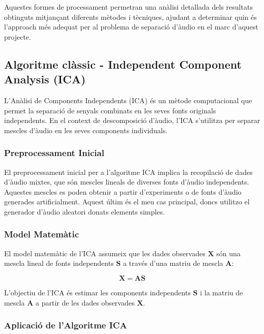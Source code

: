 \documentclass[10pt,a4paper,twocolumn,twoside]{article}
\begin{document}
Aquestes formes de processament permetran una anàlisi detallada dels resultats obtinguts mitjançant diferents mètodes i tècniques, ajudant a determinar quin és l'approach més adequat per al problema de separació d'àudio en el marc d'aquest projecte.

\subsection{Algoritme clàssic - Independent Component Analysis (ICA)}

L'Anàlisi de Components Independents (ICA) és un mètode computacional que permet la separació de senyals combinats en les seves fonts originals independents. En el context de descomposició d'àudio, l'ICA s'utilitza per separar mescles d'àudio en les seves components individuals.

\subsubsection{Preprocessament Inicial}

El preprocessament inicial per a l'algoritme ICA implica la recopilació de dades d'àudio mixtes, que són mescles lineals de diverses fonts d'àudio independents. Aquestes mescles es poden obtenir a partir d'experiments o de fonts d'àudio generades artificialment. Aquest últim és el meu cas principal, doncs utilitzo el generador d'àudio aleatori donats elements simples.

\subsubsection{Model Matemàtic}

El model matemàtic de l'ICA assumeix que les dades observades $\mathbf{X}$ són una mescla lineal de fonts independents $\mathbf{S}$ a través d'una matriu de mescla $\mathbf{A}$:

\begin{equation}
\mathbf{X} = \mathbf{A} \mathbf{S}
\end{equation}

L'objectiu de l'ICA és estimar les components independents $\mathbf{S}$ i la matriu de mescla $\mathbf{A}$ a partir de les dades observades $\mathbf{X}$.

\subsubsection{Aplicació de l'Algoritme ICA}
\end{document}
